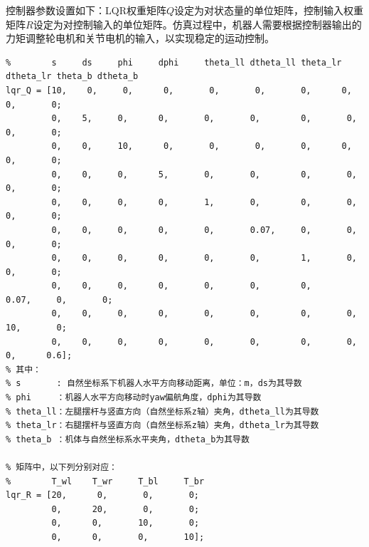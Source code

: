 控制器参数设置如下：LQR权重矩阵$Q$设定为对状态量的单位矩阵，控制输入权重矩阵$R$设定为对控制输入的单位矩阵。仿真过程中，机器人需要根据控制器输出的力矩调整轮电机和关节电机的输入，以实现稳定的运动控制。
\FloatBarrier

\begin{verbatim}
%        s     ds     phi     dphi     theta_ll dtheta_ll theta_lr dtheta_lr theta_b dtheta_b
lqr_Q = [10,    0,     0,      0,       0,       0,       0,      0,       0,       0;
         0,    5,     0,      0,       0,       0,        0,       0,        0,       0;
         0,    0,     10,      0,       0,       0,       0,      0,       0,       0;
         0,    0,     0,      5,       0,       0,        0,       0,        0,       0;
         0,    0,     0,      0,       1,       0,        0,       0,        0,       0;
         0,    0,     0,      0,       0,       0.07,     0,       0,        0,       0;
         0,    0,     0,      0,       0,       0,        1,       0,        0,       0;
         0,    0,     0,      0,       0,       0,        0,       0.07,     0,       0;
         0,    0,     0,      0,       0,       0,        0,       0,        10,       0;
         0,    0,     0,      0,       0,       0,        0,       0,        0,      0.6];
% 其中：
% s       : 自然坐标系下机器人水平方向移动距离，单位：m，ds为其导数
% phi     ：机器人水平方向移动时yaw偏航角度，dphi为其导数
% theta_ll：左腿摆杆与竖直方向（自然坐标系z轴）夹角，dtheta_ll为其导数
% theta_lr：右腿摆杆与竖直方向（自然坐标系z轴）夹角，dtheta_lr为其导数
% theta_b ：机体与自然坐标系水平夹角，dtheta_b为其导数

% 矩阵中，以下列分别对应：
%        T_wl    T_wr     T_bl     T_br
lqr_R = [20,      0,       0,       0;
         0,      20,       0,       0;
         0,      0,       10,       0;
         0,      0,       0,       10];
\end{verbatim}

\FloatBarrier

